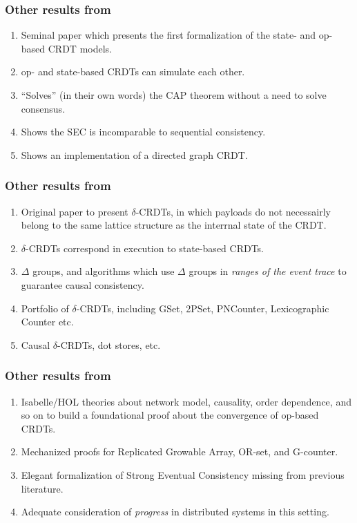 \documentclass[aspectratio=169,compress]{beamer}
\begin{document}
  \begin{frame}
    \frametitle{Other results from~\cite{shapiro11}}
    \begin{enumerate}
      \item Seminal paper which presents the first formalization of the state-
        and op-based CRDT models.
      \item op- and state-based CRDTs can simulate each other.
      \item ``Solves'' (in their own words) the CAP theorem without a need to
        solve consensus.
      \item Shows the SEC is incomparable to sequential consistency.
      \item Shows an implementation of a directed graph CRDT.
    \end{enumerate}
  \end{frame}

  \begin{frame}
    \frametitle{Other results from~\cite{almeida16}}
    \begin{enumerate}
      \item Original paper to present $\delta$-CRDTs, in which payloads do not
        necessairly belong to the same lattice structure as the interrnal state
        of the CRDT.
      \item $\delta$-CRDTs correspond in execution to state-based CRDTs.
      \item $\Delta$ groups, and algorithms which use $\Delta$ groups in
        \textit{ranges of the event trace} to guarantee causal consistency.
      \item Portfolio of $\delta$-CRDTs, including GSet, 2PSet, PNCounter,
        Lexicographic Counter etc.
      \item Causal $\delta$-CRDTs, dot stores, etc.
    \end{enumerate}
  \end{frame}

  \begin{frame}
    \frametitle{Other results from~\cite{gomes17}}
    \begin{enumerate}
      \item Isabelle/HOL theories about network model, causality, order
        dependence, and so on to build a foundational proof about the
        convergence of op-based CRDTs.
      \item Mechanized proofs for Replicated Growable Array, OR-set, and
        G-counter.
      \item Elegant formalization of Strong Eventual Consistency missing from
        previous literature.
      \item Adequate consideration of \textit{progress} in distributed systems
        in this setting.
    \end{enumerate}
  \end{frame}
\end{document}
